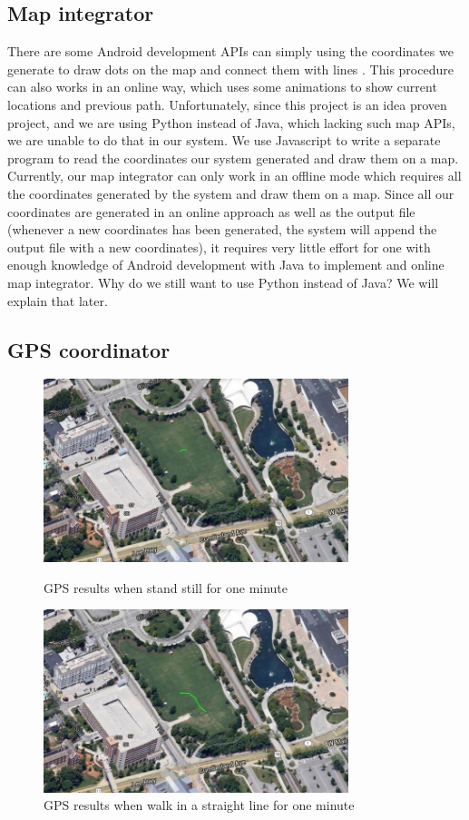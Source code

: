 \documentclass[journal]{IEEEtran}
\begin{document}
\subsection{Map integrator}
There are some Android development APIs can simply using the coordinates we generate to draw dots on the map and connect them with lines \cite{Google Map APIs}.
This procedure can also works in an online way, which uses some animations to show current locations and previous path.
Unfortunately, since this project is an idea proven project, and we are using Python instead of Java, which lacking such map APIs, we are unable to do that in our system.
We use Javascript to write a separate program to read the coordinates our system generated and draw them on a map. 
Currently, our map integrator can only work in an offline mode which requires all the coordinates generated by the system and draw them on a map.
Since all our coordinates are generated in an online approach as well as the output file (whenever a new coordinates has been generated, the system will append the output file with a new coordinates), it requires very little effort for one with enough knowledge of Android development with Java to implement and online map integrator.
Why do we still want to use Python instead of Java? We will explain that later.
\subsection{GPS coordinator}
\begin{figure}
	\centering
	\includegraphics[width=3.5in]{figures/gps-test-stand}
	\caption{GPS results when stand still for one minute}
	\includegraphics[width=3.5in]{figures/gps-test}
	\caption{GPS results when walk in a straight line for one minute}
\end{figure}
\end{document}
